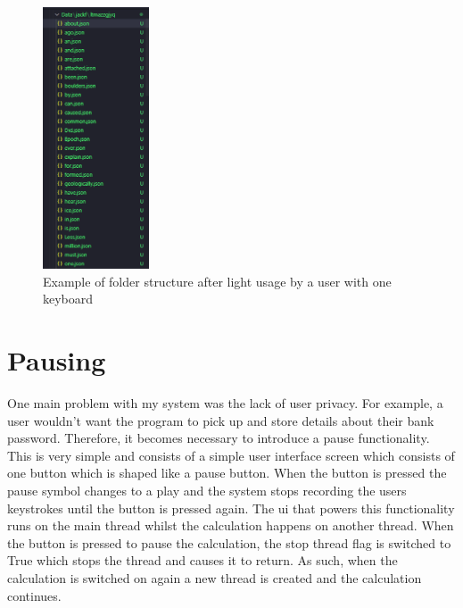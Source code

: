 \documentclass[10pt,a4paper]{report}
\begin{document}
\begin{figure}
	\begin{center}
		\includegraphics[width=0.28\textwidth]{FolderStruct}
	\end{center}
	\caption{Example of folder structure after light usage by a user with one keyboard}
	\label{fig:foldStruct}
\end{figure}

\section{Pausing}

One main problem with my system was the lack of user privacy. For example, a user wouldn't want the program to pick up and store details about their bank password. Therefore, it becomes necessary to introduce a pause functionality. This is very simple and consists of a simple user interface screen which consists of one button which is shaped like a pause button. When the button is pressed the pause symbol changes to a play and the system stops recording the users keystrokes until the button is pressed again. The ui that powers this functionality runs on the main thread whilst the calculation happens on another thread. When the button is pressed to pause the calculation, the stop thread flag is switched to True which stops the thread and causes it to return. As such, when the calculation is switched on again a new thread is created and the calculation continues.
\end{document}
